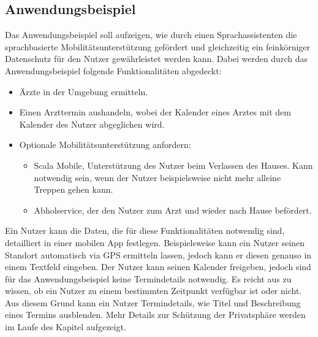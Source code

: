 \subsection{Anwendungsbeispiel}
Das Anwendungsbeispiel soll aufzeigen, wie durch einen Sprachassistenten die sprachbasierte Mobilitätsunterstützung gefördert und gleichzeitig ein feinkörniger Datenschutz für den Nutzer gewährleistet werden kann. Dabei werden durch das Anwendungsbeispiel folgende Funktionalitäten abgedeckt:

\begin{itemize}
    \item Ärzte in der Umgebung ermitteln.
    \item Einen Arzttermin aushandeln, wobei der Kalender eines Arztes mit dem Kalender des Nutzer abgeglichen wird.
    \item Optionale Mobilitätsunterstützung anfordern:
    \begin{itemize}
        \item Scala Mobile, Unterstützung des Nutzer beim Verlassen des Hauses. Kann notwendig sein, wenn der Nutzer beispielsweise nicht mehr alleine Treppen gehen kann.
        \item Abholservice, der den Nutzer zum Arzt und wieder nach Hause befördert.
    \end{itemize}
\end{itemize}

Ein Nutzer kann die Daten, die für diese Funktionalitäten notwendig sind, detailliert in einer mobilen App festlegen. Beispielsweise kann ein Nutzer seinen Standort automatisch via GPS ermitteln lassen, jedoch kann er diesen genauso in einem Textfeld eingeben. Der Nutzer kann seinen Kalender freigeben, jedoch sind für das Anwendungsbeispiel keine Termindetails notwendig. Es reicht aus zu wissen, ob ein Nutzer zu einem bestimmten Zeitpunkt verfügbar ist oder nicht. Aus diesem Grund kann ein Nutzer Termindetails, wie Titel und Beschreibung eines Termins ausblenden. Mehr Details zur Schützung der Privatsphäre werden im Laufe des Kapitel aufgezeigt. 
